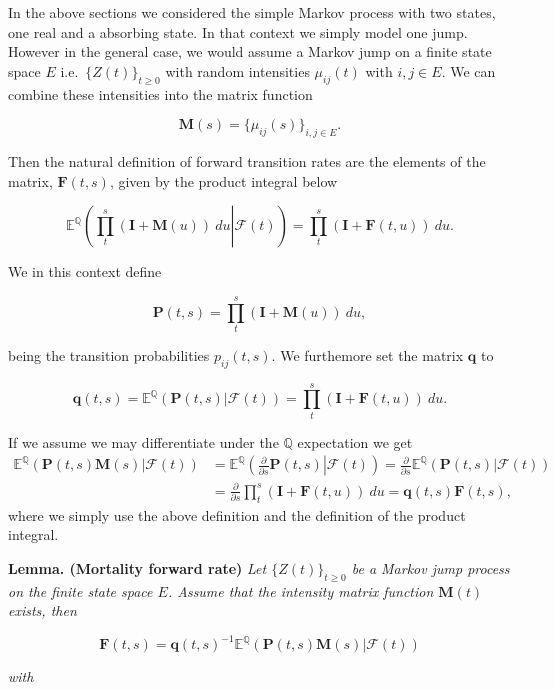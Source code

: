 \documentclass[a4paper,10pt,openany]{book}
\begin{document}
In the above sections we considered the simple Markov process with two states, one real and a absorbing state. In that context we simply model one jump. However in the general case, we would assume a Markov jump on a finite state space \(E\) i.e.~\(\{Z(t)\}_{t\ge 0}\) with random intensities \(\mu_{ij}(t)\) with \(i,j\in E\). We can combine these intensities into the matrix function

\[
\mathbf M(s)=\{\mu_{ij}(s)\}_{i,j\in E}.
\]

Then the natural definition of forward transition rates are the elements of the matrix, \(\mathbf F(t,s)\), given by the product integral below

\[
\mathbb E^{\mathbb Q}\left(\left.\prod_t^s(\mathbf I+\mathbf M(u))\ du\right\vert \mathcal F (t)\right)=\prod_t^s(\mathbf I+\mathbf F(t,u))\ du.
\]

We in this context define

\[
\mathbf P(t,s)=\prod_t^s(\mathbf I+\mathbf M(u))\ du,
\]

being the transition probabilities \(p_{ij}(t,s)\). We furthemore set the matrix \(\mathbf q\) to

\[
\mathbf q(t,s)=\mathbb E^{\mathbb Q}\left(\left.\mathbf P(t,s)\right\vert \mathcal F (t)\right)=\prod_t^s(\mathbf I+\mathbf F(t,u))\ du.
\]

If we assume we may differentiate under the \(\mathbb Q\) expectation we get
\begin{align*}
\mathbb E^{\mathbb Q}\left(\left.\mathbf P(t,s)\mathbf M(s)\right\vert \mathcal F (t)\right)&=\mathbb E^{\mathbb Q}\left(\left.\frac{\partial}{\partial s}\mathbf P(t,s)\right\vert \mathcal F (t)\right)=\frac{\partial}{\partial s}\mathbb E^{\mathbb Q}\left(\left.\mathbf P(t,s)\right\vert \mathcal F (t)\right)\\
&=\frac{\partial}{\partial s}\prod_t^s(\mathbf I+\mathbf F(t,u))\ du=\mathbf q(t,s)\mathbf F(t,s),
\end{align*}
where we simply use the above definition and the definition of the product integral.

\textbf{Lemma. (Mortality forward rate)} \emph{Let \(\{Z(t)\}_{t\ge 0}\) be a Markov jump process on the finite state space \(E\). Assume that the intensity matrix function \(\mathbf M(t)\) exists, then}

\[
\mathbf F(t,s)=\mathbf q(t,s)^{-1}\mathbb E^{\mathbb Q}\left(\left.\mathbf P(t,s)\mathbf M(s)\right\vert \mathcal F (t)\right)
\]

\emph{with}
\end{document}
